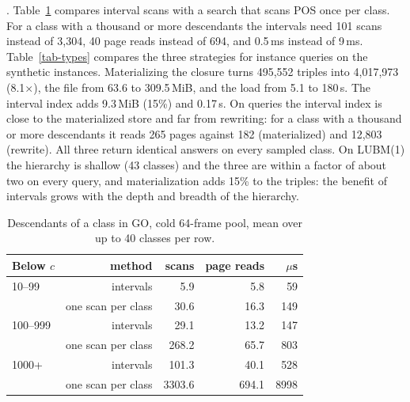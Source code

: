 .
Table~\ref{tab-desc} compares interval scans with a search that scans POS once
per class.
For a class with a thousand or more descendants the intervals need 101
scans instead of 3,304, 40 page reads instead of 694, and 0.5\,ms instead of
9\,ms.
Table~\ref{tab-types} compares the three strategies for instance queries on
the synthetic instances.
Materializing the closure turns 495,552 triples into 4,017,973 (8.1$\times$),
the file from 63.6 to 309.5\,MiB, and the load from 5.1 to 180\,s.
The interval index adds 9.3\,MiB (15\%) and 0.17\,s.
On queries the interval index is close to the materialized store and far from
rewriting: for a class with a thousand or more descendants it reads 265 pages
against 182 (materialized) and 12,803 (rewrite).
All three return identical answers on every sampled class.
On LUBM(1) the hierarchy is shallow (43 classes) and the three are within a
factor of about two on every query, and materialization adds 15\% to the
triples: the benefit of intervals grows with the depth and breadth of the
hierarchy.

\begin{table}[t]
\caption{Descendants of a class in GO, cold 64-frame pool, mean over up to 40 classes per row.}
\label{tab-desc}
\small
\begin{tabular}{@{}lrrrr@{}}
\toprule
Below $c$ & method & scans & page reads & $\mu$s \\
\midrule
10--99 & intervals & 5.9 & 5.8 & 59 \\
 & one scan per class & 30.6 & 16.3 & 149 \\
100--999 & intervals & 29.1 & 13.2 & 147 \\
 & one scan per class & 268.2 & 65.7 & 803 \\
1000+ & intervals & 101.3 & 40.1 & 528 \\
 & one scan per class & 3303.6 & 694.1 & 8998 \\
\bottomrule
\end{tabular}
\end{table}

